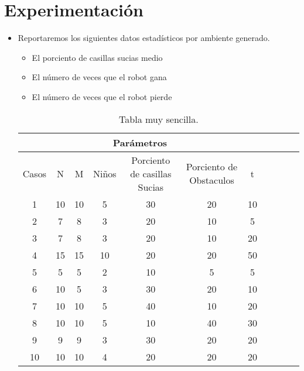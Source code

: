 \documentclass[12pt]{article}
\begin{document}
\section{Experimentaci\'on}
	\begin{itemize}
		\item Reportaremos los siguientes datos estad\'isticos por ambiente generado.
		
		\begin{itemize}
			\item El porciento de casillas sucias medio
			\item El n\'umero de veces que el robot gana
			\item El n\'umero de veces que el robot pierde
		\end{itemize}

		\begin{table}[htb]
			\centering
			\begin{tabular}{|c|c|c|c|c|c|c|c|c|c|c|}
			\hline
			\multicolumn{7}{|c|}{Par\'ametros} \\ \hline
			Casos & N & M & Niños & Porciento de casillas Sucias & Porciento de Obstaculos & t \\
			\hline
			1 & 10 & 10 & 5 & 30 & 20 & 10 \\
			\hline
			2 & 7 & 8 & 3 & 20 & 10 & 5 \\
			\hline
			3 & 7 & 8 & 3 & 20 & 10 & 20 \\
			\hline
			4 & 15 & 15 & 10 & 20 & 20 & 50 \\
			\hline
			5 & 5 & 5 & 2 & 10 & 5 & 5 \\
			\hline
			6 & 10 & 5 & 3 & 30 & 20 & 10 \\
			\hline
			7 & 10 & 10 & 5 & 40 & 10 & 20 \\
			\hline
			8 & 10 & 10 & 5 & 10 & 40 & 30 \\
			\hline
			9 & 9 & 9 & 3 & 30 & 20 & 20 \\
			\hline
			10 & 10 & 10 & 4 & 20 & 20 & 20 \\
			\hline
			\end{tabular}
			\caption{Tabla muy sencilla.}
			\label{tabla:sencilla2}
			\end{table}


\end{itemize}
\end{document}
